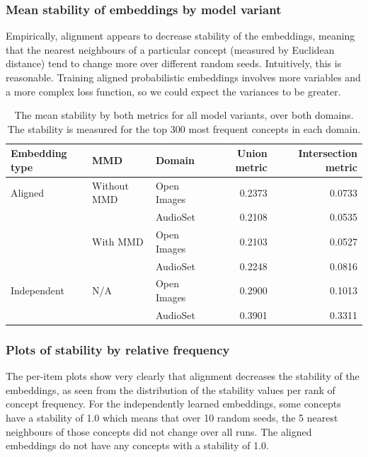 \subsubsection{Mean stability of embeddings by model variant}

Empirically, alignment appears to decrease stability of the embeddings, meaning that the nearest neighbours of a particular concept (measured by Euclidean distance) tend to change more over different random seeds. Intuitively, this is reasonable. Training aligned probabilistic embeddings involves more variables and a more complex loss function, so we could expect the variances to be greater. 

\begin{table}[H]
\centering
\begin{tabular}{lllrr}
\toprule
Embedding type  & MMD    & Domain          & Union metric & Intersection metric         \\
\midrule
Aligned & Without MMD   & Open Images &  0.2373 & 0.0733\\
            &     & AudioSet &  0.2108 & 0.0535\\
\cmidrule(lr){2-5}
            & With MMD & Open Images &  0.2103 & 0.0527\\
                   &     & AudioSet &  0.2248 & 0.0816\\
\cmidrule(lr){1-5}
Independent & N/A   & Open Images &  0.2900 & 0.1013 \\
                   &     & AudioSet &  0.3901 & 0.3311 \\
\bottomrule
\end{tabular}
\caption{The mean stability by both metrics for all model variants, over both domains. The stability is measured for the top 300 most frequent concepts in each domain.}
\end{table}

\subsubsection{Plots of stability by relative frequency}

The per-item plots show very clearly that alignment decreases the stability of the embeddings, as seen from the distribution of the stability values per rank of concept frequency. For the independently learned embeddings, some concepts have a stability of 1.0 which means that over 10 random seeds, the 5 nearest neighbours of those concepts did not change over all runs. The aligned embeddings do not have any concepts with a stability of 1.0. 

